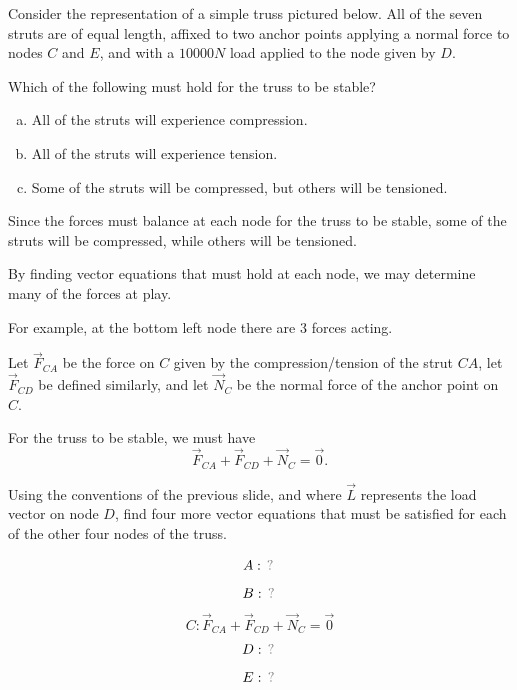 \begin{activity}{5}
Consider the representation of a simple truss pictured below.
All of the seven struts are of equal length, affixed to two anchor points
applying a normal force to nodes \(C\) and \(E\), and
with a \(10000 N\) load applied to the node given by \(D\).

\drawtruss{}

Which of the following must hold for the truss to be stable?
\begin{enumerate}[a)]
\item All of the struts will experience compression.
\item All of the struts will experience tension.
\item Some of the struts will be compressed, but others will be tensioned.
\end{enumerate}
\end{activity}

\begin{observation}
Since the forces must balance at each node for the truss to be stable,
some of the struts will be compressed, while others will be tensioned. 

\drawtruss{\trussCompletion}

By finding vector equations that must hold at each node, we may
determine many of the forces at play.
\end{observation}

\begin{remark}
For example, at the bottom left node there are 3 forces acting.

\drawtruss{\trussCForces}

Let \(\vec F_{CA}\) be the force on \(C\) given by the compression/tension
of the strut \(CA\), let \(\vec F_{CD}\) be defined similarly, and let
\(\vec N_C\) be the normal force of the anchor point on \(C\).

\vspace{1em}

For the truss to be stable, we must have
\[
\vec F_{CA}+\vec F_{CD}+\vec N_C=\vec 0
.\]
\end{remark}

\begin{activity}{10}
Using the conventions of the previous slide, and where \(\vec L\)
represents the load vector on node \(D\), find four more vector equations
that must be satisfied for each of the other four nodes of the truss.

\drawtruss

\[
A: \unknown
\]
\[
B: \unknown
\]
\[
C: \vec F_{CA}+\vec F_{CD}+\vec N_C=\vec 0
\]
\[D:\unknown\]
\[E:\unknown\]
\end{activity}

